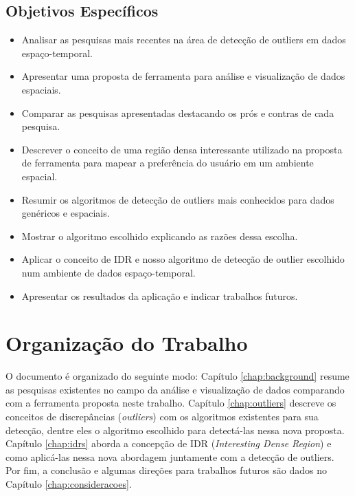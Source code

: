 \subsection{Objetivos Específicos}

\begin{itemize}
	\item
	      Analisar as pesquisas mais recentes na área de detecção de outliers em dados espaço-temporal.
	\item
	      Apresentar uma proposta de ferramenta para análise e visualização de dados espaciais.
	\item
	      Comparar as pesquisas apresentadas destacando os prós e contras de cada pesquisa.
	\item
	      Descrever o conceito de uma região densa interessante utilizado na proposta de ferramenta para mapear a preferência do usuário em um ambiente espacial.
	\item
	      Resumir os algoritmos de detecção de outliers mais conhecidos para dados genéricos e espaciais.
	\item
	      Mostrar o algoritmo escolhido explicando as razões dessa escolha.
	\item
	      Aplicar o conceito de IDR e nosso algoritmo de detecção de outlier escolhido num ambiente de dados espaço-temporal.
	\item
	      Apresentar os resultados da aplicação e indicar trabalhos futuros.

\end{itemize}

\section{Organização do Trabalho}


O documento é organizado do seguinte modo: Capítulo \ref{chap:background} resume as pesquisas existentes no campo da análise e visualização de dados comparando com a ferramenta proposta neste trabalho. Capítulo \ref{chap:outliers} descreve os conceitos de discrepâncias (\textit{outliers}) com os algoritmos existentes para sua detecção, dentre eles o algoritmo escolhido para detectá-las nessa nova proposta. Capítulo \ref{chap:idrs} aborda a concepção de IDR (\textit{Interesting Dense Region}) e como aplicá-las nessa nova abordagem juntamente com a detecção de outliers. Por fim, a conclusão e algumas direções para trabalhos futuros são dados no Capítulo \ref{chap:consideracoes}.